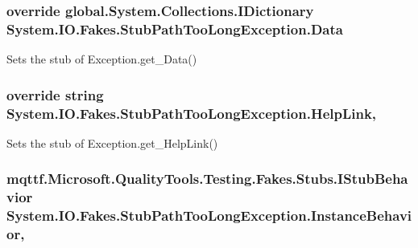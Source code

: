 \hypertarget{class_system_1_1_i_o_1_1_fakes_1_1_stub_path_too_long_exception_a13afb525eac9d502b8e0814b89a8af83}{
\subsubsection[{Data}]{\setlength{\rightskip}{0pt plus 5cm}override global.\-System.\-Collections.\-I\-Dictionary System.\-I\-O.\-Fakes.\-Stub\-Path\-Too\-Long\-Exception.\-Data\hspace{0.3cm}{\ttfamily [get]}}}\label{class_system_1_1_i_o_1_1_fakes_1_1_stub_path_too_long_exception_a13afb525eac9d502b8e0814b89a8af83}


Sets the stub of Exception.\-get\-\_\-\-Data()

\hypertarget{class_system_1_1_i_o_1_1_fakes_1_1_stub_path_too_long_exception_a2bd1c8a4bf0c1a1dd3a19629e7fe5d0b}{
\subsubsection[{Help\-Link}]{\setlength{\rightskip}{0pt plus 5cm}override string System.\-I\-O.\-Fakes.\-Stub\-Path\-Too\-Long\-Exception.\-Help\-Link\hspace{0.3cm}{\ttfamily [get]}, {\ttfamily [set]}}}\label{class_system_1_1_i_o_1_1_fakes_1_1_stub_path_too_long_exception_a2bd1c8a4bf0c1a1dd3a19629e7fe5d0b}


Sets the stub of Exception.\-get\-\_\-\-Help\-Link()

\hypertarget{class_system_1_1_i_o_1_1_fakes_1_1_stub_path_too_long_exception_ab383567ed0a8816d0926f5217466fd4f}{
\subsubsection[{Instance\-Behavior}]{\setlength{\rightskip}{0pt plus 5cm}mqttf.\-Microsoft.\-Quality\-Tools.\-Testing.\-Fakes.\-Stubs.\-I\-Stub\-Behavior System.\-I\-O.\-Fakes.\-Stub\-Path\-Too\-Long\-Exception.\-Instance\-Behavior\hspace{0.3cm}{\ttfamily [get]}, {\ttfamily [set]}}}\label{class_system_1_1_i_o_1_1_fakes_1_1_stub_path_too_long_exception_ab383567ed0a8816d0926f5217466fd4f}


